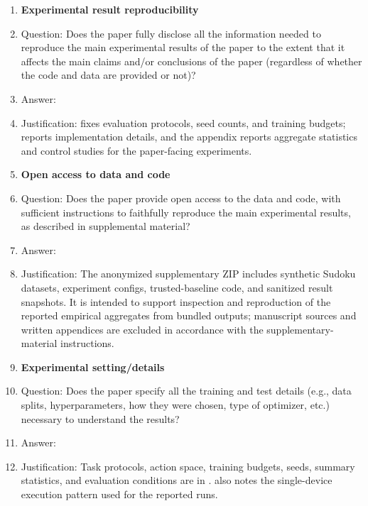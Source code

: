 \documentclass{article}
\theoremstyle{plain}
\theoremstyle{definition}
\theoremstyle{remark}
\begin{document}
\begin{enumerate}[leftmargin=*,itemsep=0.35em,topsep=0.35em]
\item {\bf Experimental result reproducibility}
    \item[] Question: Does the paper fully disclose all the information needed to reproduce the main experimental results of the paper to the extent that it affects the main claims and/or conclusions of the paper (regardless of whether the code and data are provided or not)?
    \item[] Answer: \answerYes{}
    \item[] Justification:  fixes evaluation protocols, seed counts, and training budgets;  reports implementation details, and the appendix reports aggregate statistics and control studies for the paper-facing experiments.

\item {\bf Open access to data and code}
    \item[] Question: Does the paper provide open access to the data and code, with sufficient instructions to faithfully reproduce the main experimental results, as described in supplemental material?
    \item[] Answer: \answerYes{}
    \item[] Justification: The anonymized supplementary ZIP includes synthetic Sudoku datasets, experiment configs, trusted-baseline code, and sanitized result snapshots. It is intended to support inspection and reproduction of the reported empirical aggregates from bundled outputs; manuscript sources and written appendices are excluded in accordance with the supplementary-material instructions.

\item {\bf Experimental setting/details}
    \item[] Question: Does the paper specify all the training and test details (e.g., data splits, hyperparameters, how they were chosen, type of optimizer, etc.) necessary to understand the results?
    \item[] Answer: \answerYes{}
    \item[] Justification: Task protocols, action space, training budgets, seeds, summary statistics, and evaluation conditions are in .  also notes the single-device execution pattern used for the reported runs.


\end{enumerate}
\end{document}
